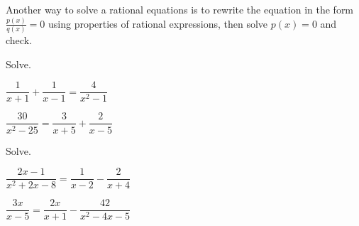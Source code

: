 \begin{note}
	Another way to solve a rational equations is to rewrite the equation in the form $\frac{p(x)}{q(x)}=0$ using properties of rational expressions, then solve $p(x)=0$ and check.
\end{note}


\newpage

\begin{exercise}
	Solve.\\[4pt]
	\begin{enumerate*}[label={(\arabic*)~}]
		\item $\dfrac1{x+1}+\dfrac1{x-1}=\dfrac4{x^2-1}$
		\item $\dfrac{30}{x^2-25}=\dfrac3{x+5}+\dfrac2{x-5}$
		\hfill\null
	\end{enumerate*}
\end{exercise}

\vfill
\begin{center} \hfill
\end{center}



\begin{exercise}
	Solve.\\[4pt]
	\begin{enumerate*}[label={(\arabic*)~}]
		\item $\dfrac{2x-1}{x^2+2x-8}=\dfrac1{x-2}-\dfrac{2}{x+4}$
		\item $\dfrac{3x}{x-5}=\dfrac{2x}{x+1}-\dfrac{42}{x^2-4x-5}$
		\hfill\null
	\end{enumerate*}
\end{exercise}

\vfill
\begin{center} \hfill
\end{center}


